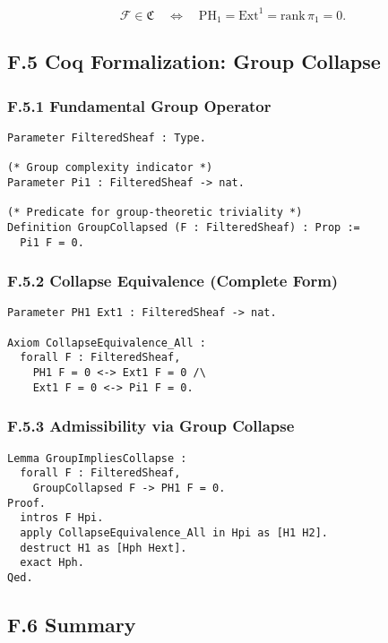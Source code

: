 \documentclass[11pt]{article}
\begin{document}
\[
\mathcal{F} \in \mathfrak{C} \quad \Leftrightarrow \quad \mathrm{PH}_1 = \mathrm{Ext}^1 = \mathrm{rank}\, \pi_1 = 0.
\]

\subsection*{F.5 Coq Formalization: Group Collapse}

\subsubsection*{F.5.1 Fundamental Group Operator}

\begin{lstlisting}[language=Coq, caption=Group-Theoretic Collapse Predicate, captionpos=b]
Parameter FilteredSheaf : Type.

(* Group complexity indicator *)
Parameter Pi1 : FilteredSheaf -> nat.

(* Predicate for group-theoretic triviality *)
Definition GroupCollapsed (F : FilteredSheaf) : Prop :=
  Pi1 F = 0.
\end{lstlisting}

\subsubsection*{F.5.2 Collapse Equivalence (Complete Form)}

\begin{lstlisting}[language=Coq, caption=Full Collapse Equivalence Axiom, captionpos=b]
Parameter PH1 Ext1 : FilteredSheaf -> nat.

Axiom CollapseEquivalence_All :
  forall F : FilteredSheaf,
    PH1 F = 0 <-> Ext1 F = 0 /\
    Ext1 F = 0 <-> Pi1 F = 0.
\end{lstlisting}

\subsubsection*{F.5.3 Admissibility via Group Collapse}

\begin{lstlisting}[language=Coq, caption=Inference from Group Collapse, captionpos=b]
Lemma GroupImpliesCollapse :
  forall F : FilteredSheaf,
    GroupCollapsed F -> PH1 F = 0.
Proof.
  intros F Hpi.
  apply CollapseEquivalence_All in Hpi as [H1 H2].
  destruct H1 as [Hph Hext].
  exact Hph.
Qed.
\end{lstlisting}

\subsection*{F.6 Summary}
\end{document}

